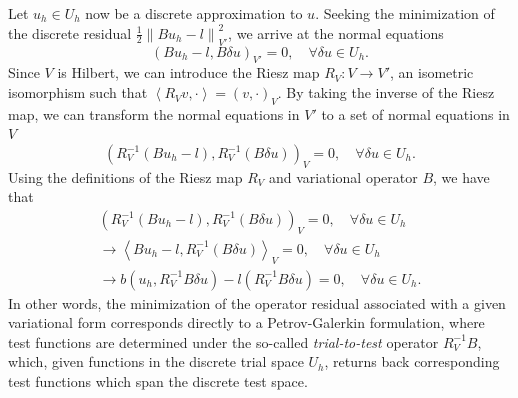\documentclass[11pt,onecolumn]{scrartcl}
\newcommand{\nor}[1]{\left\| #1 \right\|}
\newcommand{\LRp}[1]{\left( #1 \right)}
\newcommand{\LRa}[1]{\left\langle #1 \right\rangle}
\begin{document}
Let $u_h \in U_h$ now be a discrete approximation to $u$. Seeking the minimization of the discrete residual $\frac{1}{2} \nor{Bu_h-l}^2_{V'}$, we arrive at the normal equations 
\begin{equation}
\label{dualNormal}
\LRp{Bu_h-l,B\delta u}_{V'} = 0, \quad \forall \delta u \in U_h.  
\end{equation}
Since $V$ is Hilbert, we can introduce the Riesz map $R_V:V \rightarrow V'$, an isometric isomorphism such that $\LRa{R_V v,\cdot} = \LRp{v,\cdot}_V$. By taking the inverse of the Riesz map, we can transform the normal equations in $V'$ to a set of normal equations in $V$
\[
\LRp{R_V^{-1}\LRp{Bu_h-l},R_V^{-1}\LRp{B\delta u}}_{V} = 0, \quad \forall \delta u \in U_h.  
\]
Using the definitions of the Riesz map $R_V$ and variational operator $B$, we have that
\begin{align*}
\LRp{R_V^{-1}\LRp{Bu_h-l},R_V^{-1}\LRp{B\delta u}}_{V} = 0, \quad \forall \delta u \in U_h \\
\rightarrow \LRa{Bu_h-l,R_V^{-1}\LRp{B\delta u}}_{V} = 0, \quad \forall \delta u \in U_h \\
\rightarrow b\LRp{u_h,R_V^{-1} B\delta u} - l\LRp{R_V^{-1} B\delta u} = 0, \quad \forall \delta u \in U_h.
\end{align*}
In other words, the minimization of the operator residual associated with a given variational form corresponds directly to a Petrov-Galerkin formulation, where test functions are determined under the so-called \textit{trial-to-test} operator $R_V^{-1}B$, which, given functions in the discrete trial space $U_h$,  returns back corresponding test functions which span the discrete test space.  
\end{document}
